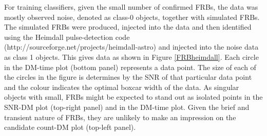 \documentclass[12pt]{article}
\begin{document}
For training classifiers, given the small number of confirmed FRBs, the data was mostly observed noise, denoted as class-0 objects, together with simulated FRBs. The simulated FRBs were produced, injected into the data and then identified using the Heimdall pulse-detection code (\textsf{http://sourceforge.net/projects/heimdall-astro}) and injected into the noise data as class 1 objects. This gives data as shown in Figure \ref{FRBheimdall}. Each circle in the DM-time plot (bottom panel) represents a data point. The size of each of the circles in the figure is determines by the SNR of that particular data point and the colour indicates the optimal boxcar width of the data. As singular objects with small, FRBs might be expected to stand out as isolated points in the SNR-DM plot (top-right panel) and in the DM-time plot. Given the brief and transient nature of FRBs, they are unlikely to make an impression on the candidate count-DM plot (top-left panel).
\end{document}

